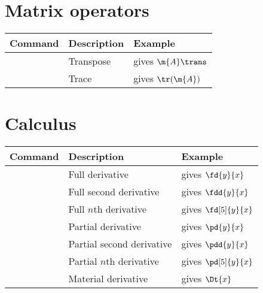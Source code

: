 \documentclass{article}
\newenvironment{doctable}{
    \begin{tabular}{|l|l|l|}
    \hline
    Command&Description&Example\\
    \hline
    \hline}{\end{tabular}}
\newcommand{\docline}[3]{\texttt{\detokenize{#2}}&#1&\texttt{\detokenize{#3}} gives $\displaystyle#3$\\\hline}
\begin{document}
\section{Matrix operators}
\begin{doctable}
    \docline{Transpose}{\trans}{\m{A}\trans}
    \docline{Trace}{\tr}{\tr(\m{A})}
\end{doctable}

\section{Calculus}
\begin{doctable}
    \docline{Full derivative}{\fd}{\fd{y}{x}}
    \docline{Full second derivative}{\fdd}{\fdd{y}{x}}
    \docline{Full $n$th derivative}{\fd}{\fd[5]{y}{x}}
    \docline{Partial derivative}{\pd}{\pd{y}{x}}
    \docline{Partial second derivative}{\pdd}{\pdd{y}{x}}
    \docline{Partial $n$th derivative}{\pd}{\pd[5]{y}{x}}
    \docline{Material derivative}{\Dt}{\Dt{x}}
\end{doctable}
\end{document}
